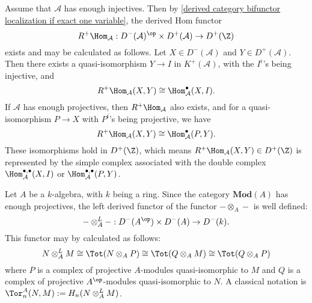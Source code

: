 \begin{example}\label{derived category bounded RHom expression eg}
Assume that $\mathcal{A}$ has enough injectives. Then by \cref{derived category bifunctor localization if exact one variable}, the derived Hom functor
\[R^+\Hom_\mathcal{A}:D^-(\mathcal{A})^{\op}\times D^+(\mathcal{A})\to D^+(\Z)\]
exists and may be calculated as follows. Let $X\in D^-(\mathcal{A})$ and $Y\in D^+(\mathcal{A})$. Then there exists a quasi-isomorphism $Y\to I$ in $K^+(\mathcal{A})$, with the $I^i$'s being injective, and
\[R^+\Hom_\mathcal{A}(X,Y)\cong\Hom_\mathcal{A}^\bullet(X,I).\]
If $\mathcal{A}$ has enough projectives, then $R^+\Hom_\mathcal{A}$ also exists, and for a quasi-isomorphism $P\to X$ with $P^i$'s being projective, we have
\[R^+\Hom_\mathcal{A}(X,Y)\cong\Hom_\mathcal{A}^\bullet(P,Y).\]
These isomorphisms hold in $D^+(\Z)$, which means $R^+\Hom_\mathcal{A}(X,Y)\in D^+(\Z)$ is represented by the simple complex associated with the double complex $\Hom_\mathcal{A}^{\bullet,\bullet}(X,I)$ or $\Hom_\mathcal{A}^{\bullet,\bullet}(P,Y)$.
\end{example}
\begin{example}\label{derived category bounded Ltensor expression eg}
Let $A$ be a $k$-algebra, with $k$ being a ring. Since the category $\mathbf{Mod}(A)$ has enough projectives, the left derived functor of the functor $-\otimes_A-$ is well defined:
\[-\otimes_A^L-:D^-(A^{\op})\times D^-(A)\to D^-(k).\]
This functor may by calculated as follows:
\[N\otimes_A^LM\cong\Tot(N\otimes_AP)\cong\Tot(Q\otimes_AM)\cong\Tot(Q\otimes_AP)\]
where $P$ is a complex of projective $A$-modules quasi-isomorphic to $M$ and $Q$ is a complex of projective $A^{\op}$-modules quasi-isomorphic to $N$. A classical notation is $\Tor_n^A(N,M):=H_n(N\otimes_A^LM)$.
\end{example}

